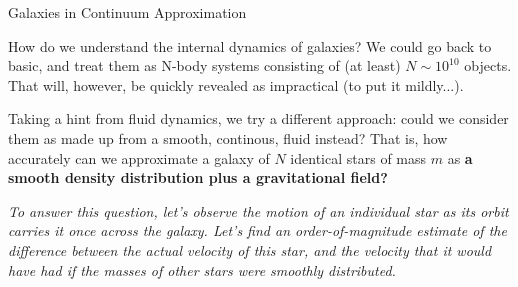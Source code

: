 \documentclass[letterpaper,landscape]{slides}
\begin{document}
\begin{slide}
\begin{center}
{\large \color{red} Galaxies in Continuum Approximation }
\end{center}

How do we understand the internal dynamics of galaxies?  We could go back to
basic, and treat them as N-body systems consisting of (at least) $N \sim
10^{10}$ objects.  That will, however, be quickly revealed as impractical (to
put it mildly...).

Taking a hint from fluid dynamics, we try a different approach: could we
consider them as made up from a smooth, continous, fluid instead?  That is,
how accurately can we approximate a galaxy of $N$ identical stars of mass
$m$ as {\bf a smooth density distribution plus a gravitational field?}

{\em To answer this question, let's observe the motion of an individual star as its
orbit carries it once across the galaxy. Let's find an order-of-magnitude
estimate of the difference between the actual velocity of this star, and the
velocity that it would have had if the masses of other stars were smoothly
distributed.}

\vfill
\end{slide}
\end{document}
